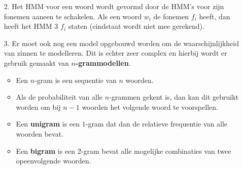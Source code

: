 \begin{itemize}
\begin{itemize}
		\item[2. ] Het HMM voor een woord wordt gevormd door de HMM's voor zijn fonemen aaneen te schakelen. Als een woord $w_i$ de fonemen $f_i$ heeft, dan heeft het HMM 3 $f_i$ staten (eindstaat wordt niet mee gerekend).
		\item[3. ] Er moet ook nog een model opgebouwd worden om de waarschijnlijkheid van zinnen te modelleren. Dit is echter zeer complex en hierbij wordt er gebruik gemaakt van \textbf{$n$-grammodellen}.
		\begin{itemize}
			\item Een $n$-gram is een sequentie van $n$ woorden.
			\item Als de probabiliteit van alle $n$-grammen gekent is, dan kan dit gebruikt worden om bij $n-1$ woorden het volgende woord te voorspellen.
			\item Een \textbf{unigram} is een $1$-gram dat dan de relatieve frequentie van alle woorden bevat.
			\item Een \textbf{bigram} is een $2$-gram bevat alle mogelijke combinaties van twee opeenvolgende woorden.
		

\end{itemize}
\end{itemize}
\end{itemize}
